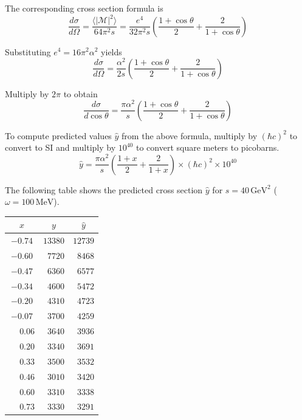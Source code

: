 \documentclass[12pt]{article}
\begin{document}
\noindent
The corresponding cross section formula is
\begin{equation*}
\frac{d\sigma}{d\Omega}
=\frac{\langle|\mathcal{M}|^2\rangle}{64\pi^2s}
=\frac{e^4}{32\pi^2s}
\left(
\frac{1+\cos\theta}{2}+\frac{2}{1+\cos\theta}
\right)
\end{equation*}

\noindent
Substituting $e^4=16\pi^2\alpha^2$ yields
\begin{equation*}
\frac{d\sigma}{d\Omega}
=\frac{\alpha^2}{2s}
\left(
\frac{1+\cos\theta}{2}+\frac{2}{1+\cos\theta}
\right)
\end{equation*}

\noindent
Multiply by $2\pi$ to obtain
\begin{equation*}
\frac{d\sigma}{d\cos\theta}
=\frac{\pi\alpha^2}{s}\left(
\frac{1+\cos\theta}{2}+\frac{2}{1+\cos\theta}
\right)
\end{equation*}

\noindent
To compute predicted values $\hat{y}$ from the above formula,
multiply by $(\hbar c)^2$ to convert to SI
and multiply by $10^{40}$ to convert square meters to picobarns.
\begin{equation*}
\hat{y}
=
\frac{\pi\alpha^2}{s}
\left(
\frac{1+x}{2}+
\frac{2}{1+x}
\right)
\times(\hbar c)^2
\times10^{40}
\end{equation*}

\noindent
The following table shows the predicted cross section $\hat{y}$
for $s=40\,\text{GeV}^2$ ($\omega=100\,\text{MeV}$).

\begin{center}
\begin{tabular}{|c|c|c|}
\hline
$x$ & $y$ & $\hat{y}$\\
\hline
$-0.74$ & $13380$ & $12739$\\
$-0.60$ & $\phantom{0}7720$ & $\phantom{0}8468$\\
$-0.47$ & $\phantom{0}6360$ & $\phantom{0}6577$\\
$-0.34$ & $\phantom{0}4600$ & $\phantom{0}5472$\\
$-0.20$ & $\phantom{0}4310$ & $\phantom{0}4723$\\
$-0.07$ & $\phantom{0}3700$ & $\phantom{0}4259$\\
$\phantom{+}0.06$ & $\phantom{0}3640$ & $\phantom{0}3936$\\
$\phantom{+}0.20$ & $\phantom{0}3340$ & $\phantom{0}3691$\\
$\phantom{+}0.33$ & $\phantom{0}3500$ & $\phantom{0}3532$\\
$\phantom{+}0.46$ & $\phantom{0}3010$ & $\phantom{0}3420$\\
$\phantom{+}0.60$ & $\phantom{0}3310$ & $\phantom{0}3338$\\
$\phantom{+}0.73$ & $\phantom{0}3330$ & $\phantom{0}3291$\\
\hline
\end{tabular}
\end{center}
\end{document}
